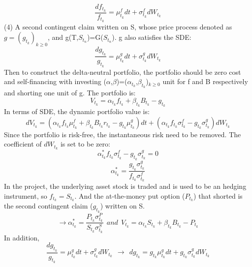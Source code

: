 \documentclass[12pt]{article}
\begin{document}
\begin{equation}
    {\frac{df_{t_k}}{f_{t_k}}} = {\mu^f_{t_k}} {dt} + {\sigma^f_{t_k}}{dW_{t_k}}
\end{equation}
(4) A second contingent claim written on S, whose price process denoted as $g=(g_{t_k})_{k \geq 0}$, and g(T,$S_{t_n}$)=G($S_{t_n}$). g also satisfies the SDE:
\begin{equation}
    {\frac{dg_{t_k}}{g_{t_k}}} = {\mu^g_{t_k}} {dt} + {\sigma^g_{t_k}}{dW_{t_k}}
\end{equation}
Then to construct the delta-neutral portfolio, the portfolio should be zero cost and self-financing with investing (${\alpha}$,${\beta}$)=(${\alpha}_{t_k}$,${\beta}_{t_k}$)$_{k \geq 0}$ unit for f and B respectively and shorting one unit of g. The portfolio is:
\begin{equation}
    {V_{t_k}} = {{\alpha}_{t_k}} {f_{t_k}} + {{\beta}_{t_k}} {B_{t_k}} - {g_{t_k}}
\end{equation}
In terms of SDE, the dynamic portfolio value is:
\begin{equation}
    {dV_{t_k}} = ({{\alpha}_{t_k}} {f_{t_k}} {\mu^f_{t_k}} + {{\beta}_{t_k}} {B_{t_k}} {r_{t_k}} - {g_{t_k}}{\mu^g_{t_k}})dt + ({{\alpha}_{t_k}} {f_{t_k}} {\sigma^f_{t_k}} - {g_{t_k}}{\sigma^g_{t_k}}){dW_{t_k}}
\end{equation}
Since the portfolio is risk-free, the instantaneous risk need to be removed. The coefficient of $dW_{t_k}$ is set to be zero:
\begin{equation}
    {\alpha^*_{t_k}} {f_{t_k}} {\sigma^f_{t_k}} - {g_{t_k}} {\sigma^g_{t_k}}=0
\end{equation}
\begin{equation}
    {\alpha^*_{t_k}} = {\frac{ {g_{t_k}} {\sigma^g_{t_k}} }  { {f_{t_k}} {\sigma^f_{t_k}} } }
\end{equation}
In the project, the underlying asset stock is traded and is used to be an hedging instrument, so ${f_{t_k}} = {S_{t_k}}$. And the at-the-money put option (${P_{t_k}}$) that shorted is the second contingent claim (${g_{t_k}}$) written on S.
\begin{equation}
    \longrightarrow {\alpha^*_{t_k}} = {\frac{ {P_{t_k}} {\sigma^P_{t_k}} }  { {S_{t_k}} {\sigma^S_{t_k}} } } 
    ~~ and ~~
    {V_{t_k}} = {{\alpha}_{t_k}} {S_{t_k}} + {{\beta}_{t_k}} {B_{t_k}} - {P_{t_k}}
\end{equation}
In addition,
\begin{equation}
    {\frac{dg_{t_k}}{g_{t_k}}} = {\mu^g_{t_k}} {dt} + {\sigma^g_{t_k}}{dW_{t_k}}
    ~~ \to ~~
    {dg_{t_k}} = {g_{t_k}}{\mu^g_{t_k}} {dt} + {g_{t_k}}{\sigma^g_{t_k}}{dW_{t_k}}
\end{equation}
\end{document}
